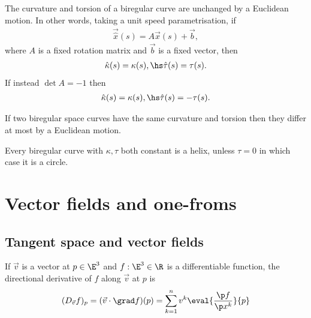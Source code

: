 \documentclass{article}
\begin{document}
\begin{proposition}
    The curvature and torsion of a biregular curve are unchanged by a Euclidean motion.
    In other words, taking a unit speed parametrisation, if
    \begin{align*}
        \vec{\hat x}(s) = A\vec x(s) + \vec b,
    \end{align*}
    where $A$ is a fixed rotation matrix and $\vec b$ is a fixed vector, then
    \begin{align*}
        \hat\kappa(s) = \kappa(s), \hs \hat\tau(s)=\tau(s).
    \end{align*}
    If instead $\det A=-1$ then
    \begin{align*}
        \hat\kappa(s)=\kappa(s), \hs \hat\tau(s) = -\tau(s).
    \end{align*}
\end{proposition}

\begin{theorem}
    If two biregular space curves have the same curvature and torsion then they differ at most
    by a Euclidean motion.
\end{theorem}

\begin{corollary}
    Every biregular curve with $\kappa,\tau$ both constant is a helix, unless $\tau=0$ in
    which case it is a circle.
\end{corollary}

\section{Vector fields and one-froms}

\subsection{Tangent space and vector fields}

\begin{definition}
    If $\vec v$ is a vector at $p\in\E^3$ and $f:\E^3\in\R$ is a differentiable function,
    the directional derivative of $f$ along $\vec v$ at $p$ is
    \begin{align*}
        (D_{\vec v}f)_p = (\vec v \cdot \grad f)(p) = \sum_{k=1}^n v^k \eval{\frac{\p f}{\p x^k}}{p}
    \end{align*}
\end{definition}
\end{document}
